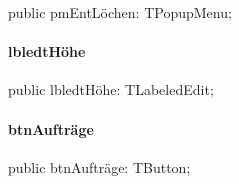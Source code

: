 \documentclass{report}
\begin{document}
\begin{list}{}{
\setlength{\itemindent}{0cm}
\setlength{\listparindent}{0cm}
\setlength{\leftmargin}{\evensidemargin}
\addtolength{\leftmargin}{\tmplength}
\settowidth{\labelsep}{X}
\addtolength{\leftmargin}{\labelsep}
\setlength{\labelwidth}{\tmplength}
}
\begin{flushleft}
\item[\textbf{Declaration}\hfill]
\begin{ttfamily}
public pmEntLöchen: TPopupMenu;\end{ttfamily}


\end{flushleft}
\end{list}
\paragraph*{lbledtHöhe}\hspace*{\fill}

\begin{list}{}{
\setlength{\itemindent}{0cm}
\setlength{\listparindent}{0cm}
\setlength{\leftmargin}{\evensidemargin}
\addtolength{\leftmargin}{\tmplength}
\settowidth{\labelsep}{X}
\addtolength{\leftmargin}{\labelsep}
\setlength{\labelwidth}{\tmplength}
}
\begin{flushleft}
\item[\textbf{Declaration}\hfill]
\begin{ttfamily}
public lbledtHöhe: TLabeledEdit;\end{ttfamily}


\end{flushleft}
\end{list}
\paragraph*{btnAufträge}\hspace*{\fill}

\begin{list}{}{
\setlength{\itemindent}{0cm}
\setlength{\listparindent}{0cm}
\setlength{\leftmargin}{\evensidemargin}
\addtolength{\leftmargin}{\tmplength}
\settowidth{\labelsep}{X}
\addtolength{\leftmargin}{\labelsep}
\setlength{\labelwidth}{\tmplength}
}
\begin{flushleft}
\item[\textbf{Declaration}\hfill]
\begin{ttfamily}
public btnAufträge: TButton;\end{ttfamily}


\end{flushleft}
\end{list}
\end{document}
